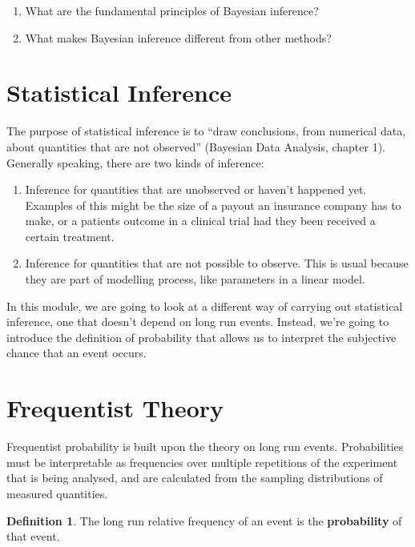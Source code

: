 \documentclass[
]{book}
\providecommand{\tightlist}{%
  \setlength{\itemsep}{0pt}\setlength{\parskip}{0pt}}
\theoremstyle{definition}
\newtheorem{definition}{Definition}[chapter]
\theoremstyle{definition}
\theoremstyle{definition}
\theoremstyle{definition}
\theoremstyle{remark}
\begin{document}
\begin{enumerate}
\def\labelenumi{\arabic{enumi}.}
\item
  What are the fundamental principles of Bayesian inference?
\item
  What makes Bayesian inference different from other methods?
\end{enumerate}

\hypertarget{statistical-inference}{%
\section{Statistical Inference}\label{statistical-inference}}

The purpose of statistical inference is to ``draw conclusions, from numerical data, about quantities that are not observed'' (Bayesian Data Analysis, chapter 1). Generally speaking, there are two kinds of inference:

\begin{enumerate}
\def\labelenumi{\arabic{enumi}.}
\tightlist
\item
  Inference for quantities that are unobserved or haven't happened yet. Examples of this might be the size of a payout an insurance company has to make, or a patients outcome in a clinical trial had they been received a certain treatment.
\item
  Inference for quantities that are not possible to observe. This is usual because they are part of modelling process, like parameters in a linear model.
\end{enumerate}

In this module, we are going to look at a different way of carrying out statistical inference, one that doesn't depend on long run events. Instead, we're going to introduce the definition of probability that allows us to interpret the subjective chance that an event occurs.

\hypertarget{frequentist-theory}{%
\section{Frequentist Theory}\label{frequentist-theory}}

Frequentist probability is built upon the theory on long run events. Probabilities must be interpretable as frequencies over multiple repetitions of the experiment that is being analysed, and are calculated from the sampling distributions of measured quantities.

\begin{definition}
The long run relative frequency of an event is the \textbf{probability} of that event.
\end{definition}
\end{document}
